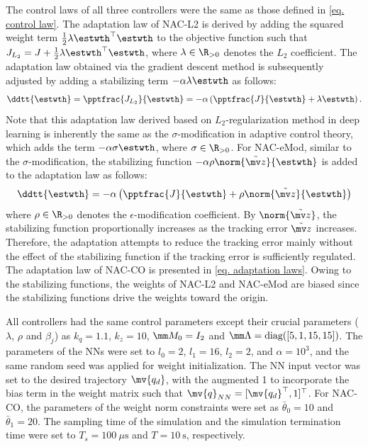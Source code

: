 \documentclass[letterpaper, 10 pt, conference]{ieeeconf}  %
\newcommand*{\q}{\mv{q}}
\newcommand*{\qd}{\mv{q_d}}
\begin{document}
The control laws of all three controllers were the same as those defined in \eqref{eq. control law}.
The adaptation law of NAC-L2 is derived by adding the squared weight term $\tfrac{1}{2}\lambda{\estwth}^\top {\estwth}$ to the objective function such that $J_{L_2} = J+\tfrac{1}{2}\lambda{\estwth}^\top {\estwth}$, where $\lambda\in\R_{>0}$ denotes the $L_2$ coefficient.
The adaptation law obtained via the gradient descent method is subsequently adjusted by adding a stabilizing term $-\alpha\lambda{\estwth}$ as follows:
\begin{equation} 
    \ddtt{{\estwth}} = 
    \pptfrac{J_{L_2}}{\estwth}
    =-\alpha
    \left(
        \pptfrac{J}{\estwth}
        +
        \lambda{\estwth}
    \right)
    .
    \label{eq. adap L2}
\end{equation}
Note that this adaptation law derived based on $L_2$-regularization method in deep learning is inherently the same as the $\sigma$-modification in adaptive control theory, which adds the term $-\alpha\sigma{\estwth}$, where $\sigma\in\R_{>0}$.
For NAC-eMod, similar to the $\sigma$-modification, the stabilizing function $-\alpha\rho\norm{\tilde{\mv z}}{\estwth}$ is added to the adaptation law as follows:
\begin{equation}
    \ddtt{{\estwth}} = -\alpha
    \left(
        \pptfrac{J}{\estwth}
        +
        \rho\norm{\tilde {\mv z}}{\estwth}
    \right)
    \label{eq. adap eMod}
\end{equation}
where $\rho\in\R_{>0}$ denotes the $\epsilon$-modification coefficient.
By $\norm{\tilde {\mv z}}$, the stabilizing function proportionally increases as the tracking error $\tilde {\mv z}$ increases.
Therefore, the adaptation attempts to reduce the tracking error mainly without the effect of the stabilizing function if the tracking error is sufficiently regulated.
The adaptation law of NAC-CO is presented in \eqref{eq. adaptation laws}.
Owing to the stabilizing functions, the weights of NAC-L2 and NAC-eMod are biased since the stabilizing functions drive the weights toward the origin.

All controllers had the same control parameters except their crucial parameters (\ie $\lambda$, $\rho$ and $\beta_j$) as $k_q=1.1$, $k_z=10$, $\mm M_0=I_2$ and $\mm \Lambda=\text{diag}([5,1,15,15])$.
The parameters of the NNs were set to $l_0=2$, $l_1=16$, $l_2=2$, and $\alpha=10^3$, and the same random seed was applied for weight initialization.
The NN input vector was set to the desired trajectory $\qd$, with the augmented 1 to incorporate the bias term in the weight matrix such that $\q_{NN}=[\qd^\top ,1]^\top $.
For NAC-CO, the parameters of the weight norm constraints were set as $\bar\theta_0=10$ and $\bar\theta_1=20$.
The sampling time of the simulation and the simulation termination time were set to $T_s=100\ \mu\mathrm{s}$ and $T=10\ \mathrm{s}$, respectively.
\end{document}
